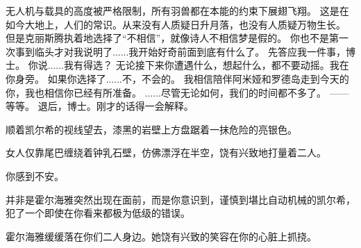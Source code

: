 \documentclass[openany]{book}
\begin{document}
\begin{dialogue}
     无人机与载具的高度被严格限制，所有羽兽都在本能的约束下展翅飞翔。
     这是在如今大地上，人们的常识。从来没有人质疑日升月落，也没有人质疑万物生长。
     但是克丽斯腾执着地选择了“不相信”，就像诗人不相信梦是假的。
     你也不是第一次事到临头才对我说明了......我开始好奇前面到底有什么了。
     先答应我一件事，博士。
     你说......我有得选？
     无论接下来你遭遇什么，想起什么，都不要动摇。我在你身旁。
     如果你选择了......不，不会的。
     我相信陪伴阿米娅和罗德岛走到今天的你，我也相信你已经有所准备。
     ......尽管无论如何，我们的时间都不多了。
     ——等等。
     退后，博士。刚才的话得一会解释。
\end{dialogue}\par

顺着凯尔希的视线望去，漆黑的岩壁上方盘踞着一抹危险的亮银色。\par
女人仅靠尾巴缠绕着钟乳石壁，仿佛漂浮在半空，饶有兴致地打量着二人。\par
你感到不安。\par
并非是霍尔海雅突然出现在面前，而是你意识到，谨慎到堪比自动机械的凯尔希，犯了一个即使在你看来都极为低级的错误。\par
霍尔海雅缓缓落在你们二人身边。她饶有兴致的笑容在你的心脏上抓挠。
\end{document}
